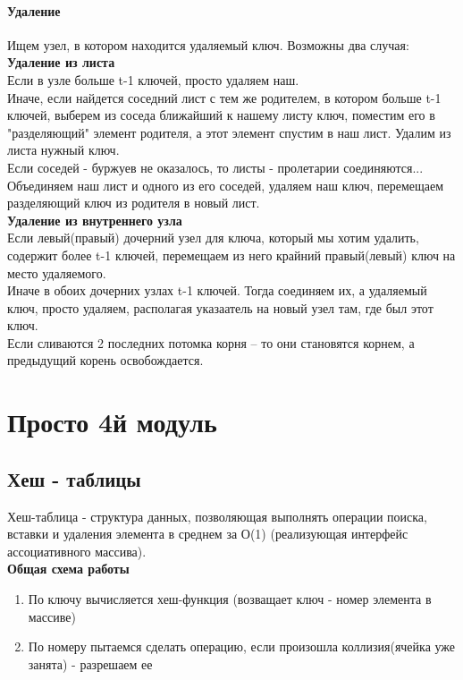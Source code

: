 \documentclass[a4paper,10pt]{article}
\begin{document}
\paragraph{Удаление}
Ищем узел, в котором находится удаляемый ключ. Возможны два случая:\\
\textbf{Удаление из листа}\\
Если в узле больше t-1 ключей, просто удаляем наш.\\
Иначе, если найдется соседний лист с тем же родителем, в котором больше t-1 ключей, выберем из соседа ближайший к нашему листу ключ, поместим его в "разделяющий" элемент родителя, а этот элемент спустим в наш лист. Удалим из листа нужный ключ.\\
Если соседей - буржуев не оказалось, то листы - пролетарии соединяются...  Объединяем наш лист и одного из его соседей, удаляем наш ключ, перемещаем разделяющий ключ из родителя в новый лист.\\
\textbf{Удаление из внутреннего узла}\\
Если левый(правый) дочерний узел для ключа, который мы хотим удалить, содержит более t-1 ключей, перемещаем из него крайний правый(левый) ключ на место удаляемого.\\
Иначе в обоих дочерних узлах t-1 ключей. Тогда соединяем их, а удаляемый ключ, просто удаляем, располагая указаатель на новый узел там, где был этот ключ.\\
Если сливаются 2 последних потомка корня – то они становятся корнем, а предыдущий корень освобождается.\\ 
\section{Просто 4й модуль}
\subsection{Хеш - таблицы}
Хеш-таблица - структура данных, позволяющая выполнять операции поиска, вставки и удаления элемента в среднем за О(1) (реализующая интерфейс ассоциативного массива).\\
\textbf{Общая схема работы}\\
\begin{enumerate}
	\item По ключу вычисляется хеш-функция (возващает ключ - номер элемента в массиве)
	\item По номеру пытаемся сделать операцию, если произошла коллизия(ячейка уже занята) - разрешаем ее
\end{enumerate}
\end{document}

